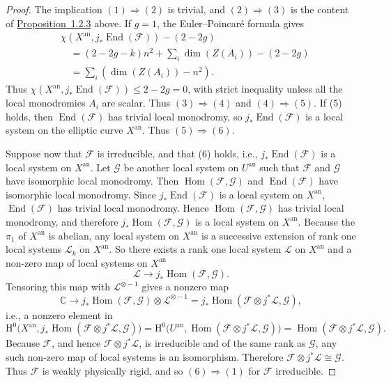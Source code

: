 \begin{proof}
The implication \((1)\Rightarrow(2)\) is trivial, and \((2)\Rightarrow(3)\) is
the content of \hyperref[prop:1.2.3]{Proposition~1.2.3} above. If \(g=1\), the Euler--Poincaré formula
gives
\begin{align*}
  &\chi(X^{\mathrm{an}},j_*\operatorname{End}(\mathcal{F}))-(2-2g)\\
  &\quad =
  (2-2g-k)n^2+\sum_i\dim(Z(A_i))-(2-2g)\\
  &\quad =
  \sum_i(\dim(Z(A_i))-n^2).
\end{align*}
Thus
\(\chi(X^{\mathrm{an}},j_*\operatorname{End}(\mathcal{F}))\leq 2-2g=0\),
with strict inequality unless all the local monodromies \(A_i\) are scalar. Thus
\((3)\Rightarrow(4)\) and \((4)\Rightarrow(5)\). If (5) holds, then
\(\operatorname{End}(\mathcal{F})\) has trivial local monodromy, so
\(j_*\operatorname{End}(\mathcal{F})\) is a local system on the elliptic curve
\(X^{\mathrm{an}}\). Thus \((5)\Rightarrow(6)\).

Suppose now that \(\mathcal{F}\) is irreducible, and that (6) holds, i.e.,
\(j_*\operatorname{End}(\mathcal{F})\) is a local system on \(X^{\mathrm{an}}\).
Let \(\mathcal{G}\) be another local system on \(U^{\mathrm{an}}\) such that
\(\mathcal{F}\) and \(\mathcal{G}\) have isomorphic local monodromy. Then
\(\operatorname{Hom}(\mathcal{F},\mathcal{G})\) and
\(\operatorname{End}(\mathcal{F})\) have isomorphic local monodromy. Since
\(j_*\operatorname{End}(\mathcal{F})\) is a local system on \(X^{\mathrm{an}}\),
\(\operatorname{End}(\mathcal{F})\) has trivial local monodromy. Hence
\(\operatorname{Hom}(\mathcal{F},\mathcal{G})\) has trivial local monodromy,
and therefore \(j_*\operatorname{Hom}(\mathcal{F},\mathcal{G})\) is a local
system on \(X^{\mathrm{an}}\). Because the \(\pi_1\) of \(X^{\mathrm{an}}\) is
abelian, any local system on \(X^{\mathrm{an}}\) is a successive extension of
rank one local systems \(\mathcal{L}_k\) on \(X^{\mathrm{an}}\). So there exists
a rank one local system \(\mathcal{L}\) on \(X^{\mathrm{an}}\) and a non-zero
map of local systems on \(X^{\mathrm{an}}\)
\[
  \mathcal{L}\to j_*\operatorname{Hom}(\mathcal{F},\mathcal{G}).
\]
Tensoring this map with \(\mathcal{L}^{\otimes -1}\) gives a nonzero map
\[
  \mathbb{C}\to
  j_*\operatorname{Hom}(\mathcal{F},\mathcal{G})\otimes\mathcal{L}^{\otimes -1}
  =
  j_*\operatorname{Hom}(\mathcal{F}\otimes j^*\mathcal{L},\mathcal{G}),
\]
i.e., a nonzero element in
\[
  \mathrm{H}^0\bigl(X^{\mathrm{an}},
    j_*\operatorname{Hom}(\mathcal{F}\otimes j^*\mathcal{L},\mathcal{G})\bigr)
  =
  \mathrm{H}^0\bigl(U^{\mathrm{an}},
    \operatorname{Hom}(\mathcal{F}\otimes j^*\mathcal{L},\mathcal{G})\bigr)
  =
  \operatorname{Hom}(\mathcal{F}\otimes j^*\mathcal{L},\mathcal{G}).
\]
Because \(\mathcal{F}\), and hence \(\mathcal{F}\otimes j^*\mathcal{L}\), is
irreducible and of the same rank as \(\mathcal{G}\), any such non-zero map of
local systems is an isomorphism. Therefore
\(\mathcal{F}\otimes j^*\mathcal{L}\cong \mathcal{G}\). Thus
\(\mathcal{F}\) is weakly physically rigid, and so \((6)\Rightarrow(1)\) for
\(\mathcal{F}\) irreducible.
\end{proof}

